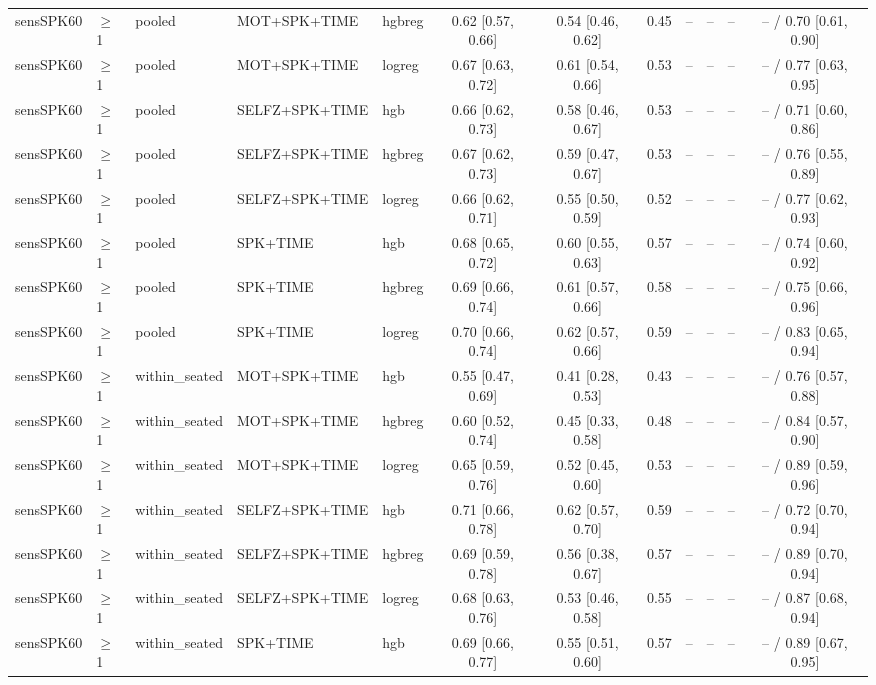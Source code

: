 \begin{longtable}{@{}lllllcccrrrc@{}}
sensSPK60 & $\geq$1 & pooled & MOT+SPK+TIME & hgbreg & 0.62 [0.57, 0.66] & 0.54 [0.46, 0.62] & 0.45 & -- & -- & -- & -- / 0.70 [0.61, 0.90] \\
sensSPK60 & $\geq$1 & pooled & MOT+SPK+TIME & logreg & 0.67 [0.63, 0.72] & 0.61 [0.54, 0.66] & 0.53 & -- & -- & -- & -- / 0.77 [0.63, 0.95] \\
sensSPK60 & $\geq$1 & pooled & SELFZ+SPK+TIME & hgb & 0.66 [0.62, 0.73] & 0.58 [0.46, 0.67] & 0.53 & -- & -- & -- & -- / 0.71 [0.60, 0.86] \\
sensSPK60 & $\geq$1 & pooled & SELFZ+SPK+TIME & hgbreg & 0.67 [0.62, 0.73] & 0.59 [0.47, 0.67] & 0.53 & -- & -- & -- & -- / 0.76 [0.55, 0.89] \\
sensSPK60 & $\geq$1 & pooled & SELFZ+SPK+TIME & logreg & 0.66 [0.62, 0.71] & 0.55 [0.50, 0.59] & 0.52 & -- & -- & -- & -- / 0.77 [0.62, 0.93] \\
sensSPK60 & $\geq$1 & pooled & SPK+TIME & hgb & 0.68 [0.65, 0.72] & 0.60 [0.55, 0.63] & 0.57 & -- & -- & -- & -- / 0.74 [0.60, 0.92] \\
sensSPK60 & $\geq$1 & pooled & SPK+TIME & hgbreg & 0.69 [0.66, 0.74] & 0.61 [0.57, 0.66] & 0.58 & -- & -- & -- & -- / 0.75 [0.66, 0.96] \\
sensSPK60 & $\geq$1 & pooled & SPK+TIME & logreg & 0.70 [0.66, 0.74] & 0.62 [0.57, 0.66] & 0.59 & -- & -- & -- & -- / 0.83 [0.65, 0.94] \\
sensSPK60 & $\geq$1 & within\_seated & MOT+SPK+TIME & hgb & 0.55 [0.47, 0.69] & 0.41 [0.28, 0.53] & 0.43 & -- & -- & -- & -- / 0.76 [0.57, 0.88] \\
sensSPK60 & $\geq$1 & within\_seated & MOT+SPK+TIME & hgbreg & 0.60 [0.52, 0.74] & 0.45 [0.33, 0.58] & 0.48 & -- & -- & -- & -- / 0.84 [0.57, 0.90] \\
sensSPK60 & $\geq$1 & within\_seated & MOT+SPK+TIME & logreg & 0.65 [0.59, 0.76] & 0.52 [0.45, 0.60] & 0.53 & -- & -- & -- & -- / 0.89 [0.59, 0.96] \\
sensSPK60 & $\geq$1 & within\_seated & SELFZ+SPK+TIME & hgb & 0.71 [0.66, 0.78] & 0.62 [0.57, 0.70] & 0.59 & -- & -- & -- & -- / 0.72 [0.70, 0.94] \\
sensSPK60 & $\geq$1 & within\_seated & SELFZ+SPK+TIME & hgbreg & 0.69 [0.59, 0.78] & 0.56 [0.38, 0.67] & 0.57 & -- & -- & -- & -- / 0.89 [0.70, 0.94] \\
sensSPK60 & $\geq$1 & within\_seated & SELFZ+SPK+TIME & logreg & 0.68 [0.63, 0.76] & 0.53 [0.46, 0.58] & 0.55 & -- & -- & -- & -- / 0.87 [0.68, 0.94] \\
sensSPK60 & $\geq$1 & within\_seated & SPK+TIME & hgb & 0.69 [0.66, 0.77] & 0.55 [0.51, 0.60] & 0.57 & -- & -- & -- & -- / 0.89 [0.67, 0.95] \\

\end{longtable}
